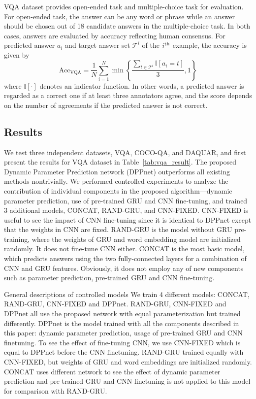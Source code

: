 \documentclass[10pt,twocolumn,letterpaper]{article}
\begin{document}
VQA dataset provides open-ended task and multiple-choice task for evaluation.
For open-ended task, the answer can be any word or phrase while an answer should be chosen out of 18 candidate answers in the multiple-choice task.
In both cases, answers are evaluated by accuracy reflecting human consensus.
For predicted answer $a_i$ and target answer set $\mathcal{T}^{i}$ of the $i^{\rm th}$ example, the accuracy is given by
\begin{equation}
\text{Acc}_\textrm{VQA} = \frac{1}{N} \sum _{i=1}^{N}{\min { \left\{ \frac{\sum _{t\in \mathcal{T}^{i}}{  {\mathbb{I}} \left[a_i=t\right]}}{3} , 1\right\} }  }
\end{equation}
where ${\mathbb{I}}\left[ \cdot \right]$ denotes an indicator function.
In other words, a predicted answer is regarded as a correct one if at least three annotators agree, and the score depends on the number of agreements if the predicted answer is not correct.




\subsection{Results}

We test three independent datasets, VQA, COCO-QA, and DAQUAR, and first present the results for VQA dataset in Table~\ref{tab:vqa_result}.
The proposed Dynamic Parameter Prediction network (DPPnet) outperforms all existing methods nontrivially.
We performed controlled experiments to analyze the contribution of individual components in the proposed algorithm---dynamic parameter prediction, use of pre-trained GRU and CNN fine-tuning, and trained 3 additional models, CONCAT, RAND-GRU, and CNN-FIXED.
CNN-FIXED is useful to see the impact of CNN fine-tuning since it is identical to DPPnet except that the weights in CNN are fixed.
RAND-GRU is the model without GRU pre-training, where the weights of GRU and word embedding model are initialized randomly.
It does not fine-tune CNN either.
CONCAT is the most basic model, which predicts answers using the two fully-connected layers for a combination of CNN and GRU features.
Obviously, it does not employ any of new components such as parameter prediction, pre-trained GRU and CNN fine-tuning.


\iffalse
{\color{blue}General descriptions of controlled models}
We train 4 different models: CONCAT, RAND-GRU, CNN-FIXED and DPPnet.
RAND-GRU, CNN-FIXED and DPPnet all use the proposed network with equal parameterization but trained differently.
DPPnet is the model trained with all the components described in this paper: dynamic parameter prediction, usage of pre-trained GRU and CNN finetuning.
To see the effect of fine-tuning CNN, we use CNN-FIXED which is equal to DPPnet before the CNN finetuning.
RAND-GRU trained equally with CNN-FIXED, but weights of GRU and word embeddings are initialized randomly.
CONCAT uses different network to see the effect of dynamic parameter prediction and pre-trained GRU and CNN finetuning is not applied to this model for comparison with RAND-GRU.
\end{document}
